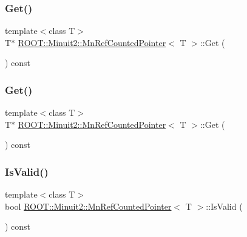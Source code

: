\subsubsection{\texorpdfstring{Get()}{Get()}\hspace{0.1cm}{\footnotesize\ttfamily [2/3]}}
{\footnotesize\ttfamily template$<$class T$>$ \\
T$\ast$ \mbox{\hyperlink{classROOT_1_1Minuit2_1_1MnRefCountedPointer}{R\+O\+O\+T\+::\+Minuit2\+::\+Mn\+Ref\+Counted\+Pointer}}$<$ T $>$\+::Get (\begin{DoxyParamCaption}{ }\end{DoxyParamCaption}) const\hspace{0.3cm}{\ttfamily [inline]}}

\mbox{\label{classROOT_1_1Minuit2_1_1MnRefCountedPointer_ae88bd272c286587bad6200c41c66909b}} 
\subsubsection{\texorpdfstring{Get()}{Get()}\hspace{0.1cm}{\footnotesize\ttfamily [3/3]}}
{\footnotesize\ttfamily template$<$class T$>$ \\
T$\ast$ \mbox{\hyperlink{classROOT_1_1Minuit2_1_1MnRefCountedPointer}{R\+O\+O\+T\+::\+Minuit2\+::\+Mn\+Ref\+Counted\+Pointer}}$<$ T $>$\+::Get (\begin{DoxyParamCaption}{ }\end{DoxyParamCaption}) const\hspace{0.3cm}{\ttfamily [inline]}}

\mbox{\label{classROOT_1_1Minuit2_1_1MnRefCountedPointer_a29a80f5f0dce4b10f42b04b3b3cb264c}} 
\subsubsection{\texorpdfstring{IsValid()}{IsValid()}\hspace{0.1cm}{\footnotesize\ttfamily [1/3]}}
{\footnotesize\ttfamily template$<$class T$>$ \\
bool \mbox{\hyperlink{classROOT_1_1Minuit2_1_1MnRefCountedPointer}{R\+O\+O\+T\+::\+Minuit2\+::\+Mn\+Ref\+Counted\+Pointer}}$<$ T $>$\+::Is\+Valid (\begin{DoxyParamCaption}{ }\end{DoxyParamCaption}) const\hspace{0.3cm}{\ttfamily [inline]}}

